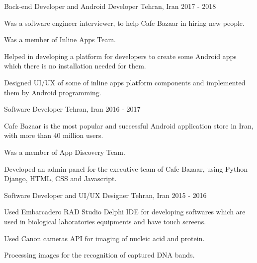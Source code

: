 

\begin{cventries}

 \cventry
    {Back-end Developer and Android Developer} %
    {} %
    {Tehran, Iran} %
    {2017 - 2018} %
    {
      \begin{cvitems} %
        \item {Was a software engineer interviewer, to help Cafe Bazaar in hiring new people.}
        \item {Was a member of Inline Apps Team.}
        \item {Helped in developing a platform for developers to create some Android apps which there is no installation needed for them.}
        \item {Designed UI/UX of some of inline apps platform components and implemented them by Android programming.}
      \end{cvitems}
    }

  \cventry
    {Software Developer} %
    {} %
    {Tehran, Iran} %
    {2016 - 2017} %
    {
      \begin{cvitems} %
        \item {Cafe Bazaar is the most popular and successful Android application store in Iran, with
more than 40 million users.}
        \item {Was a member of App Discovery Team.}
        \item {Developed an admin panel for the executive team of Cafe Bazaar, using Python Django, HTML, CSS and Javascript.}
      \end{cvitems}
    }

  \cventry
    {Software Developer and UI/UX Designer} %
    {} %
    {Tehran, Iran} %
    {2015 - 2016} %
    {
      \begin{cvitems} %
        \item {Used Embarcadero RAD Studio Delphi IDE for developing softwares which are used in biological laboratories equipments and have touch screens.}
        \item {Used Canon cameras API for imaging of nucleic acid and protein.}
        \item {Processing images for the recognition of captured DNA bands.}
      \end{cvitems}
    }


\end{cventries}
